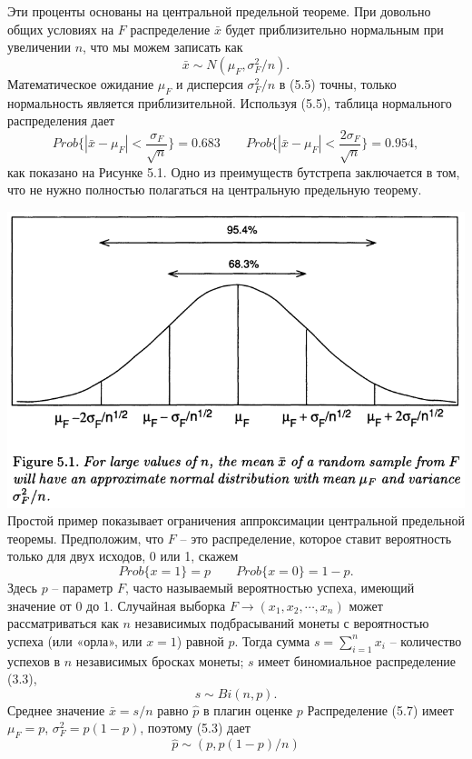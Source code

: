 Эти проценты основаны на центральной предельной теореме. При довольно общих условиях на $F$ распределение $\bar x$ будет приблизительно нормальным при увеличении $n$, что мы можем записать как 
\begin{equation}
    \bar x\sim N(\mu_F,\sigma^2_F/n).
\end{equation}
Математическое ожидание $\mu_F$ и дисперсия $\sigma^2_F/n$ в (5.5) точны, только нормальность является приблизительной. Используя (5.5), таблица нормального распределения дает 
\begin{equation}
    Prob\{|\bar x - \mu_F|<\frac{\sigma_F}{\sqrt{n}}\}=0.683\qquad Prob\{|\bar x - \mu_F|<\frac{2\sigma_F}{\sqrt{n}}\}=0.954,
\end{equation}
как показано на Рисунке 5.1. Одно из преимуществ бутстрепа заключается в том, что не нужно полностью полагаться на центральную предельную теорему.
\newline

\noindent
\includegraphics[width=\linewidth]{4/f51.png}
\newline
Простой пример показывает ограничения аппроксимации центральной предельной теоремы. Предположим, что $F$ -- это распределение, которое ставит вероятность только для двух исходов, 0 или 1, скажем 
\begin{equation}
    Prob\{x=1\}=p\qquad Prob\{x=0\}=1-p.
\end{equation}
Здесь $p$ -- параметр $F$, часто называемый вероятностью успеха, имеющий значение от 0 до 1. Случайная выборка $F \rightarrow (x_1, x_2,\cdots, x_n)$ может рассматриваться как $n$ независимых подбрасываний монеты с вероятностью успеха (или «орла», или $x = 1$) равной $p$. Тогда сумма $s = \sum_{i=1}^nx_i$ -- количество успехов в $n$ независимых бросках монеты; $s$ имеет биномиальное распределение (3.3), 
\begin{equation}
    s\sim Bi(n,p).
\end{equation}
Среднее значение $\bar x = s / n$ равно $\hat p$ в плагин оценке $p$ Распределение (5.7) имеет $\mu_F=p$, $\sigma^2_F = p (1- p)$, поэтому (5.3) дает 
\begin{equation}
    \hat p\sim (p,p(1-p)/n)
\end{equation}

